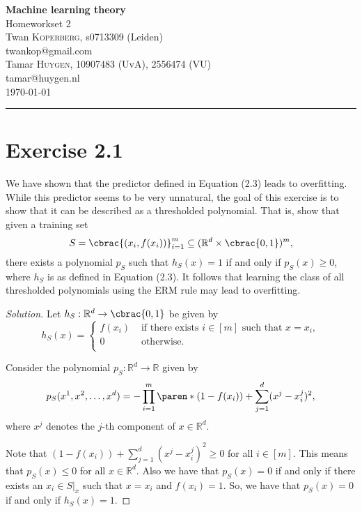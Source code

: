 \documentclass[10pt, a4paper, twoside]{amsart}
\makeatletter
\newcommand{\R}{\ensuremath{\mathbb{R}}}
\DeclarePairedDelimiter\cbrac\{\}
\DeclarePairedDelimiter\paren()
\newcommand{\se}{\ensuremath{\subseteq}}
\newenvironment{solution}
               {\let\oldqedsymbol=\qedsymbol
                \renewcommand{\qedsymbol}{$\blacktriangleleft$}
                \begin{proof}[Solution]}
               {\end{proof}
                \renewcommand{\qedsymbol}{\oldqedsymbol}}
\newcommand{\firstName}  {Twan}
\newcommand{\lastName}   {Koperberg}
\newcommand{\studId}     {0713309 (Leiden)}
\renewcommand{\email}    {twankop@gmail.com}
\newcommand{\firstNameII}  {Tamar}
\newcommand{\lastNameII}   {Huygen}
\newcommand{\studIdII}     {10907483 (UvA)}
\newcommand{\studIdIII}    {2556474 (VU)}
\newcommand{\emailII}     {tamar@huygen.nl}
\makeatother
\begin{document}
\begin{center}
  {\huge\bf Machine learning theory}\\
  {\large\sc Homeworkset 2 }\\ \vspace{1em}
  \firstName \textsc{ \lastName}, {\sc s}\studId \\
  \email\text{}\\ \smallskip
  \firstNameII \textsc{ \lastNameII}, \studIdII, \studIdIII\\
  \emailII \\ \bigskip
  \today \\\bigskip
  \hrule
  \bigskip
\end{center}

\section*{Exercise 2.1}
We have shown that the predictor defined in Equation (2.3) leads to overfitting. 
While this predictor seems to be very unnatural, the goal of this exercise is to show 
that it can be described as a thresholded polynomial. 
That is, show that given a training set 
\begin{equation*}
S = \cbrac{(x_i, f(x_i))}_{i=1}^{m} \se (\R^d \times \cbrac{0,1})^m, 
\end{equation*}
there exists a polynomial $p_S$ such that $h_S(x) = 1$ if and only if $p_S(x)\geq 0$, 
where $h_S$ is as defined in Equation (2.3). It follows that learning the class of all 
thresholded polynomials using the ERM rule may lead to overfitting.
\begin{solution}
Let $h_S:\R^d\to\cbrac{0,1}$ be given by
\begin{equation*}
 h_S(x)=
 \begin{cases}
  f(x_i) & \text{ if there exists }i \in [m] \text{ such that } x=x_i, \\
  0 & \text{ otherwise.} \\  
 \end{cases}
\end{equation*}

Consider the polynomial $p_S:\R^d \to \R$ given by
\begin{equation*}
 p_S(x^1,x^2,\ldots,x^d)=-\prod_{i=1}^{m}\paren*{(1-f(x_i))+\sum_{j=1}^d(x^j-x_i^j)^2},
\end{equation*}
where $x^j$ denotes the $j$-th component of $x \in \R^d$.

Note that $(1-f(x_i))+\sum_{j=1}^d(x^j-x_i^j)^2 \geq 0$ for all $i \in [m]$.
This means that $p_{S}(x)\leq 0$ for all $x \in \R^d$. Also we have that $p_S(x)=0$ if and only if there exists an 
$x_i \in S|_x$ such that $x=x_i$ and $f(x_i)=1$. So, we have that $p_S(x)=0$ if and only if $h_S(x)=1$.
\end{solution}
\end{document}
